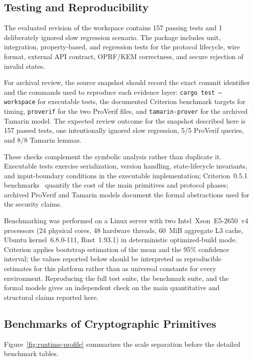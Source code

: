 \documentclass[preprint,12pt]{elsarticle}
\theoremstyle{remark}
\begin{document}
\subsection{Testing and Reproducibility}

The evaluated revision of the workspace contains 157 passing tests and
1 deliberately ignored slow regression scenario. The package includes
unit, integration, property-based, and regression tests for the
protocol lifecycle, wire format, external API contract, OPRF/KEM correctness,
and secure rejection of invalid states.

For archival review, the source snapshot should record the exact commit
identifier and the commands used to reproduce each evidence layer:
\texttt{cargo test --workspace} for executable tests, the documented
Criterion benchmark targets for timing, \texttt{proverif} for the two
ProVerif files, and \texttt{tamarin-prover} for the archived Tamarin
model. The expected review outcome for the snapshot described here is
157 passed tests, one intentionally ignored slow regression, 5/5
ProVerif queries, and 8/8 Tamarin lemmas.

These checks complement the symbolic analysis rather than duplicate it.
Executable tests exercise serialization, version handling, state-lifecycle
invariants, and input-boundary conditions in the executable
implementation; Criterion~0.5.1 benchmarks~\cite{heisler2023} quantify
the cost of the main primitives and protocol phases; archived ProVerif
and Tamarin models document the formal abstractions used for the
security claims.

Benchmarking was performed on a Linux server with two
Intel~Xeon~E5-2650~v4 processors (24 physical cores, 48 hardware
threads, 60~MiB aggregate L3 cache, Ubuntu kernel~6.8.0-111,
Rust~1.93.1) in deterministic optimized-build mode.
Criterion applies bootstrap estimation of the mean and the 95\%
confidence interval; the values reported below should be interpreted
as reproducible estimates for this platform rather than as universal
constants for every environment. Reproducing the full test suite, the
benchmark suite, and the formal models gives an independent check on the
main quantitative and structural claims reported here.

\subsection{Benchmarks of Cryptographic Primitives}

Figure~\ref{fig:runtime-profile} summarizes the scale separation before
the detailed benchmark tables.
\end{document}
